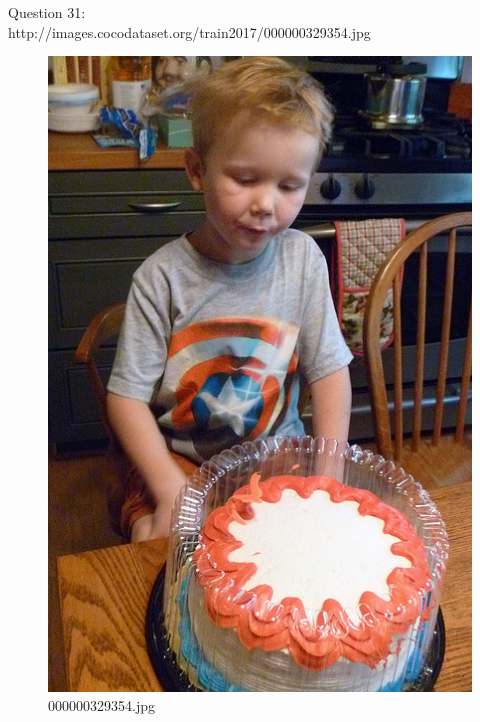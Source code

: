     Question 31:\\http://images.cocodataset.org/train2017/000000329354.jpg
    \begin{figure}[h]
        \centering
        \includegraphics[width=0.8\linewidth]{../image set/easy/000000329354.jpg}
        \caption{000000329354.jpg}
    \end{figure}
